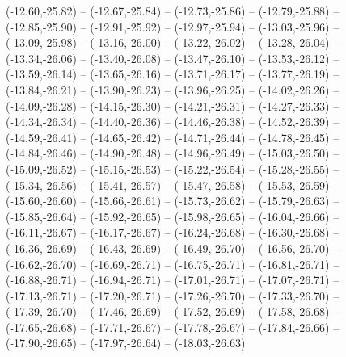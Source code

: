{  (-12.60,-25.82) -- (-12.67,-25.84) -- (-12.73,-25.86) -- (-12.79,-25.88) -- (-12.85,-25.90) -- (-12.91,-25.92) -- (-12.97,-25.94) --
  (-13.03,-25.96) -- (-13.09,-25.98) -- (-13.16,-26.00) -- (-13.22,-26.02) -- (-13.28,-26.04) -- (-13.34,-26.06) -- (-13.40,-26.08) --
  (-13.47,-26.10) -- (-13.53,-26.12) -- (-13.59,-26.14) -- (-13.65,-26.16) -- (-13.71,-26.17) -- (-13.77,-26.19) -- (-13.84,-26.21) --
  (-13.90,-26.23) -- (-13.96,-26.25) -- (-14.02,-26.26) -- (-14.09,-26.28) -- (-14.15,-26.30) -- (-14.21,-26.31) -- (-14.27,-26.33) --
  (-14.34,-26.34) -- (-14.40,-26.36) -- (-14.46,-26.38) -- (-14.52,-26.39) -- (-14.59,-26.41) -- (-14.65,-26.42) -- (-14.71,-26.44) --
  (-14.78,-26.45) -- (-14.84,-26.46) -- (-14.90,-26.48) -- (-14.96,-26.49) -- (-15.03,-26.50) -- (-15.09,-26.52) -- (-15.15,-26.53) --
  (-15.22,-26.54) -- (-15.28,-26.55) -- (-15.34,-26.56) -- (-15.41,-26.57) -- (-15.47,-26.58) -- (-15.53,-26.59) -- (-15.60,-26.60) --
  (-15.66,-26.61) -- (-15.73,-26.62) -- (-15.79,-26.63) -- (-15.85,-26.64) -- (-15.92,-26.65) -- (-15.98,-26.65) -- (-16.04,-26.66) --
  (-16.11,-26.67) -- (-16.17,-26.67) -- (-16.24,-26.68) -- (-16.30,-26.68) -- (-16.36,-26.69) -- (-16.43,-26.69) -- (-16.49,-26.70) --
  (-16.56,-26.70) -- (-16.62,-26.70) -- (-16.69,-26.71) -- (-16.75,-26.71) -- (-16.81,-26.71) -- (-16.88,-26.71) -- (-16.94,-26.71) --
  (-17.01,-26.71) -- (-17.07,-26.71) -- (-17.13,-26.71) -- (-17.20,-26.71) -- (-17.26,-26.70) -- (-17.33,-26.70) -- (-17.39,-26.70) --
  (-17.46,-26.69) -- (-17.52,-26.69) -- (-17.58,-26.68) -- (-17.65,-26.68) -- (-17.71,-26.67) -- (-17.78,-26.67) -- (-17.84,-26.66) --
  (-17.90,-26.65) -- (-17.97,-26.64) -- (-18.03,-26.63)}
